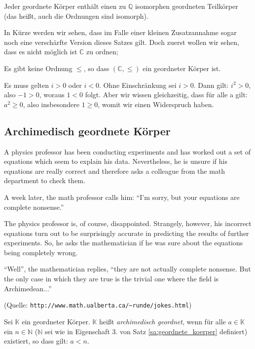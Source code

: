 \documentclass[10pt]{scrbook}
\begin{document}
\begin{Sa}
Jeder geordnete Körper enthält einen zu $\mathbb{Q}$ isomorphen geordneten Teilkörper (das heißt, auch die Ordnungen sind isomorph).
\end{Sa}

In Kürze werden wir sehen, dass im Falle einer kleinen Zusatzannahme sogar noch eine verschärfte Version dieses Satzes gilt. Doch zuerst wollen wir sehen, dass es nicht möglich ist $\mathbb{C}$ zu ordnen;

\begin{Sa}
Es gibt keine Ordnung $\leq$, so dass $(\mathbb{C}, \leq)$ ein geordneter Körper ist.
\end{Sa}

\begin{bew}
Es muss gelten $i>0$ oder $i<0$. Ohne Einschränkung sei $i>0$. Dann gilt: $i^2>0$, also $-1>0$, woraus $1<0$ folgt. Aber wir wissen gleichzeitig, dass für alle a gilt: $a^2\geq 0$, also insbesondere $1\geq 0$, womit wir einen Widerspruch haben.
\end{bew}

\subsection{Archimedisch geordnete Körper}

A physics professor has been conducting experiments and has worked out a set of equations which seem to explain his data. Nevertheless, he is unsure if his equations are really correct and therefore asks a colleague from the math department to check them.

A week later, the math professor calls him: "`I'm sorry, but your equations are complete nonsense."'

The physics professor is, of course, disappointed. Strangely, however, his incorrect equations turn out to be surprisingly accurate in predicting the results of further experiments. So, he asks the mathematician if he was sure about the equations being completely wrong.

"`Well"', the mathematician replies, "`they are not actually complete nonsense. But the only case in which they are true is the trivial one where the field is Archimedean..."'

(Quelle: \verb|http://www.math.ualberta.ca/~runde/jokes.html|)

\begin{Def}
Sei $\mathbb{K}$ ein geordneter Körper. $\mathbb{K}$ heißt \emph{archimedisch geordnet}, wenn für alle $a\in\mathbb{K}$ ein $n\in\mathbb{N}$ ($\mathbb{N}$ sei wie in Eigenschaft 3. von Satz \ref{sa:geordnete_koerper} definiert) existiert, so dass gilt: $a<n$.
\end{Def}
\end{document}
